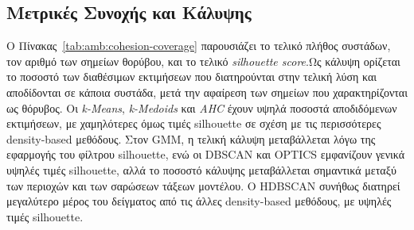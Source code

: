 \subsection{Μετρικές Συνοχής και Κάλυψης}

Ο Πίνακας~\ref{tab:amb:cohesion-coverage} παρουσιάζει το τελικό πλήθος συστάδων, τον αριθμό των σημείων θορύβου, και το τελικό \textenglish{\textit{silhouette score}}.Ως κάλυψη ορίζεται το ποσοστό των διαθέσιμων εκτιμήσεων που διατηρούνται στην τελική λύση και αποδίδονται σε κάποια συστάδα, μετά την αφαίρεση των σημείων που χαρακτηρίζονται ως θόρυβος. Οι \textenglish{\textit{k-Means}}, \textenglish{\textit{k-Medoids}} και \textenglish{\textit{AHC}} έχουν υψηλά ποσοστά αποδιδόμενων εκτιμήσεων, με χαμηλότερες όμως τιμές silhouette σε σχέση με τις περισσότερες density-based μεθόδους. Στον GMM, η τελική κάλυψη μεταβάλλεται λόγω της εφαρμογής του φίλτρου silhouette, ενώ οι DBSCAN και OPTICS εμφανίζουν γενικά υψηλές τιμές silhouette, αλλά το ποσοστό κάλυψης μεταβάλλεται σημαντικά μεταξύ των περιοχών και των σαρώσεων τάξεων μοντέλου. Ο HDBSCAN συνήθως διατηρεί μεγαλύτερο μέρος του δείγματος από τις άλλες density-based μεθόδους, με υψηλές τιμές silhouette. 

